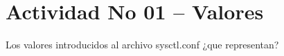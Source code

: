 \section{Actividad No 01 – Valores} 
Los valores introducidos al archivo sysctl.conf ¿que representan?
